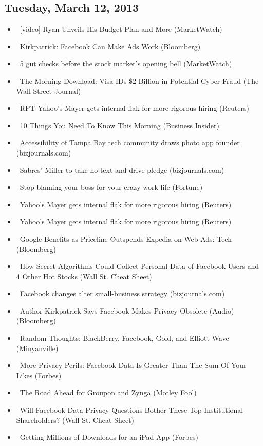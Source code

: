 \documentclass[11pt,asymmetric]{article}
\begin{document}
\subsection*{Tuesday, March 12, 2013}
\begin{itemize}
\item\ [video] Ryan Unveils His Budget Plan and More (MarketWatch)
\item\ Kirkpatrick: Facebook Can Make Ads Work (Bloomberg)
\item\ 5 gut checks before the stock market's opening bell (MarketWatch)
\item\ The Morning Download: Visa IDs \$2 Billion in Potential Cyber Fraud (The Wall Street Journal)
\item\ RPT-Yahoo's Mayer gets internal flak for more rigorous hiring (Reuters)
\item\ 10 Things You Need To Know This Morning (Business Insider)
\item\ Accessibility of Tampa Bay tech community draws photo app founder (bizjournals.com)
\item\ Sabres' Miller to take no text-and-drive pledge (bizjournals.com)
\item\ Stop blaming your boss for your crazy work-life (Fortune)
\item\ Yahoo's Mayer gets internal flak for more rigorous hiring (Reuters)
\item\ Yahoo's Mayer gets internal flak for more rigorous hiring (Reuters)
\item\ Google Benefits as Priceline Outspends Expedia on Web Ads: Tech (Bloomberg)
\item\ How Secret Algorithms Could Collect Personal Data of Facebook Users and 4 Other Hot Stocks (Wall St. Cheat Sheet)
\item\ Facebook changes alter small-business strategy (bizjournals.com)
\item\ Author Kirkpatrick Says Facebook Makes Privacy Obsolete (Audio) (Bloomberg)
\item\ Random Thoughts: BlackBerry, Facebook, Gold, and Elliott Wave (Minyanville)
\item\ More Privacy Perils: Facebook Data Is Greater Than The Sum Of Your Likes (Forbes)
\item\ The Road Ahead for Groupon and Zynga (Motley Fool)
\item\ Will Facebook Data Privacy Questions Bother These Top Institutional Shareholders? (Wall St. Cheat Sheet)
\item\ Getting Millions of Downloads for an iPad App (Forbes)

\end{itemize}
\end{document}
